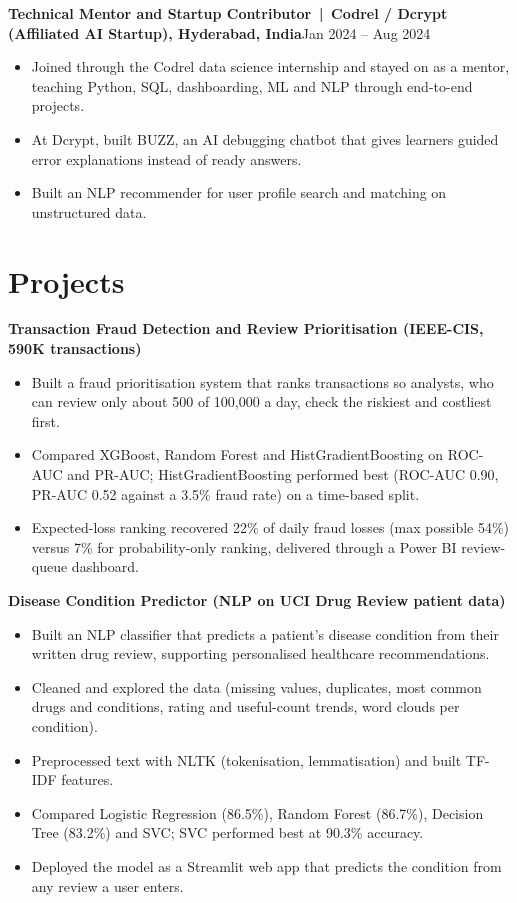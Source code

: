 \documentclass[10pt,a4paper]{article}
\newcommand{\entry}[2]{\textbf{#1}\hfill #2\\[-2pt]}
\begin{document}
\vspace{4pt}
\entry{Technical Mentor and Startup Contributor \,|\, Codrel / Dcrypt (Affiliated AI Startup), Hyderabad, India}{Jan 2024 -- Aug 2024}
\begin{itemize}
  \item Joined through the Codrel data science internship and stayed on as a mentor, teaching Python, SQL, dashboarding, ML and NLP through end-to-end projects.
  \item At Dcrypt, built BUZZ, an AI debugging chatbot that gives learners guided error explanations instead of ready answers.
  \item Built an NLP recommender for user profile search and matching on unstructured data.
\end{itemize}

\section{Projects}

\entry{Transaction Fraud Detection and Review Prioritisation \normalfont(IEEE-CIS, 590K transactions)}{}
\begin{itemize}
  \item Built a fraud prioritisation system that ranks transactions so analysts, who can review only about 500 of 100,000 a day, check the riskiest and costliest first.
  \item Compared XGBoost, Random Forest and HistGradientBoosting on ROC-AUC and PR-AUC; HistGradientBoosting performed best (ROC-AUC 0.90, PR-AUC 0.52 against a 3.5\% fraud rate) on a time-based split.
  \item Expected-loss ranking recovered 22\% of daily fraud losses (max possible 54\%) versus 7\% for probability-only ranking, delivered through a Power BI review-queue dashboard.
\end{itemize}

\vspace{4pt}
\entry{Disease Condition Predictor \normalfont(NLP on UCI Drug Review patient data)}{}
\begin{itemize}
  \item Built an NLP classifier that predicts a patient's disease condition from their written drug review, supporting personalised healthcare recommendations.
  \item Cleaned and explored the data (missing values, duplicates, most common drugs and conditions, rating and useful-count trends, word clouds per condition).
  \item Preprocessed text with NLTK (tokenisation, lemmatisation) and built TF-IDF features.
  \item Compared Logistic Regression (86.5\%), Random Forest (86.7\%), Decision Tree (83.2\%) and SVC; SVC performed best at 90.3\% accuracy.
  \item Deployed the model as a Streamlit web app that predicts the condition from any review a user enters.
\end{itemize}
\end{document}
